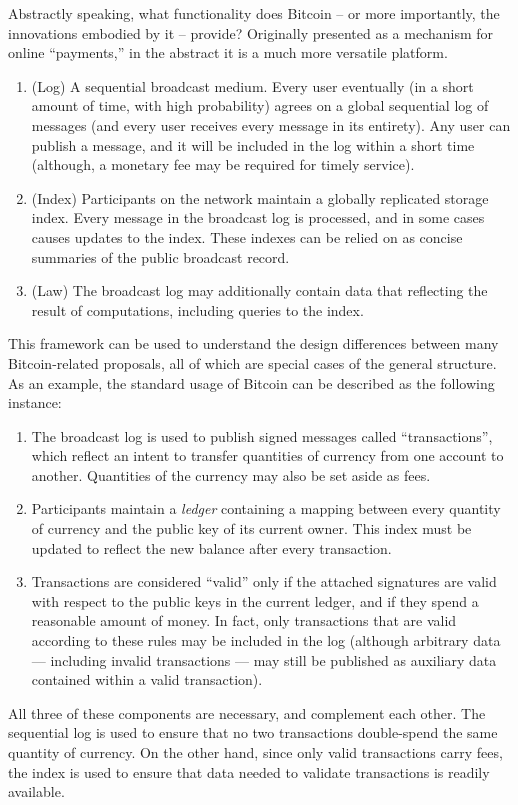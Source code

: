 Abstractly speaking, what functionality does Bitcoin -- or more importantly, the innovations embodied by it -- provide? Originally presented as a mechanism for online ``payments,'' in the abstract it is a much more versatile platform.

\begin{enumerate}
\item (Log) A sequential broadcast medium. Every user eventually (in a short amount of time, with high probability) agrees on a global sequential log of messages (and every user receives every message in its entirety). Any user can publish a message, and it will be included in the log within a short time (although, a monetary fee may be required for timely service).
\item (Index) Participants on the network maintain a globally replicated storage index. Every message in the broadcast log is processed, and in some cases causes updates to the index. These indexes can be relied on as concise summaries of the public broadcast record.
\item (Law) The broadcast log may additionally contain data that reflecting the result of computations, including queries to the index.
\end{enumerate}

This framework can be used to understand the design differences between many Bitcoin-related proposals, all of which are special cases of the general structure. As an example, the standard usage of Bitcoin can be described as the following instance:
\begin{enumerate}
\item The broadcast log is used to publish signed messages called ``transactions'', which reflect an intent to transfer quantities of currency from one account to another. Quantities of the currency may also be set aside as fees.
\item Participants maintain a \emph{ledger} containing a mapping between every quantity of currency and the public key of its current owner. This index must be updated to reflect the new balance after every transaction.
\item Transactions are considered ``valid'' only if the attached signatures are valid with respect to the public keys in the current ledger, and if they spend a reasonable amount of money. In fact, only transactions that are valid according to these rules may be included in the log (although arbitrary data --- including invalid transactions --- may still be published as auxiliary data contained within a valid transaction).
\end{enumerate}
All three of these components are necessary, and complement each other. The sequential log is used to ensure that no two transactions double-spend the same quantity of currency. On the other hand, since only valid transactions carry fees, the index is used to ensure that data needed to validate transactions is readily available.

